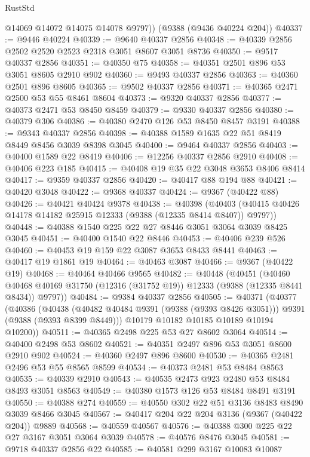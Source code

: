 \begin{lexlean}{RustStd}
\begin{coremodule}
        @14069
        @14072
        @14075
        @14078
        @9797))
    (@9388 (@9436 @40224 @204))
@40337 := @9446 @40224
@40339 := @9640 @40337 @2856
@40348 := @40339 @2856 @2502 @2520 @2523 @2318 @3051 @8607 @3051 @8736
@40350 := @9517 @40337 @2856
@40351 := @40350 @75
@40358 := @40351 @2501 @896 @53 @3051 @8605 @2910 @902
@40360 := @9493 @40337 @2856
@40363 := @40360 @2501 @896 @8605
@40365 := @9502 @40337 @2856
@40371 := @40365 @2471 @2500 @53 @55 @8461 @8604
@40373 := @9320 @40337 @2856
@40377 := @40373 @2471 @53 @8450 @8459
@40379 := @9330 @40337 @2856
@40380 := @40379 @306
@40386 := @40380 @2470 @126 @53 @8450 @8457 @3191
@40388 := @9343 @40337 @2856
@40398 := @40388 @1589 @1635 @22 @51 @8419 @8449 @8456 @3039 @8398 @3045
@40400 := @9464 @40337 @2856
@40403 := @40400 @1589 @22 @8419
@40406 := @12256 @40337 @2856 @2910
@40408 := @40406 @223 @185
@40415 := @40408 @19 @35 @22 @3048 @3653 @8406 @8414
@40417 := @9359 @40337 @2856
@40420 := @40417 @88 @194 @88
@40421 := @40420 @3048
@40422 := @9368 @40337
@40424 := @9367 (@40422 @88)
@40426 := @40421 @40424 @9378
@40438 := @40398
    (@40403 (@40415 @40426 @14178 @14182 @25915 @12333 (@9388 (@12335 @8414 @8407)) @9797))
@40448 := @40388 @1540 @225 @22 @27 @8446 @3051 @3064 @3039 @8425 @3045
@40451 := @40400 @1540 @22 @8446
@40453 := @40406 @239 @526
@40460 := @40453 @19 @159 @22 @3087 @3653 @8433 @8441
@40463 := @40417 @19 @1861 @19
@40464 := @40463 @3087
@40466 := @9367 (@40422 @19)
@40468 := @40464 @40466 @9565
@40482 := @40448
    (@40451
      (@40460 @40468 @40169 @31750 (@12316 (@31752 @19)) @12333 (@9388 (@12335 @8441 @8434)) @9797))
@40484 := @9384 @40337 @2856
@40505 := @40371
    (@40377
      (@40386
        (@40438 (@40482 @40484 @9391 (@9388 (@9393 @8426 @3051))) @9391 (@9388 (@9393 @8399 @8449)))
        @10179
        @10182
        @10185
        @10189
        @10194
        @10200))
@40511 := @40365 @2498 @225 @53 @27 @8602 @3064
@40514 := @40400 @2498 @53 @8602
@40521 := @40351 @2497 @896 @53 @3051 @8600 @2910 @902
@40524 := @40360 @2497 @896 @8600
@40530 := @40365 @2481 @2496 @53 @55 @8565 @8599
@40534 := @40373 @2481 @53 @8484 @8563
@40535 := @40339 @2910
@40543 := @40535 @2473 @923 @2480 @53 @8484 @8493 @3051 @8563
@40549 := @40380 @1573 @126 @53 @8484 @8491 @3191
@40550 := @40388 @274
@40559 := @40550 @302 @22 @51 @3136 @8483 @8490 @3039 @8466 @3045
@40567 := @40417 @204 @22 @204 @3136 (@9367 (@40422 @204)) @9889
@40568 := @40559 @40567
@40576 := @40388 @300 @225 @22 @27 @3167 @3051 @3064 @3039
@40578 := @40576 @8476 @3045
@40581 := @9718 @40337 @2856 @22
@40585 := @40581 @299 @3167 @10083 @10087

\end{coremodule}
\end{lexlean}
